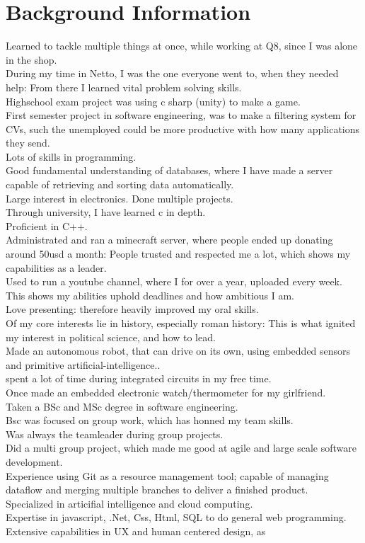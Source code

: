 \section*{Background Information}
Learned to tackle multiple things at once, while working at Q8, since I was alone in the shop.\\During my time in Netto, I was the one everyone went to, when they needed help: From there I learned vital problem solving skills.\\Highschool exam project was using c sharp (unity) to make a game.\\First semester project in software engineering, was to make a filtering system for CVs, such the unemployed could be more productive with how many applications they send.\\Lots of skills in programming.\\Good fundamental understanding of databases, where I have made a server capable of retrieving and sorting data automatically.\\Large interest in electronics. Done multiple projects.\\Through university, I have learned c in depth.\\Proficient in C++.\\Administrated and ran a minecraft server, where people ended up donating around 50usd a month: People trusted and respected me a lot, which shows my capabilities as a leader.\\Used to run a youtube channel, where I for over a year, uploaded every week. This shows my abilities uphold deadlines and how ambitious I am.\\Love presenting: therefore heavily improved my oral skills.\\Of my core interests lie in history, especially roman history: This is what ignited my interest in political science, and how to lead.\\Made an autonomous robot, that can drive on its own, using embedded sensors and primitive artificial-intelligence..\\spent a lot of time during integrated circuits in my free time.\\Once made an embedded electronic watch/thermometer for my girlfriend.\\Taken a BSc and MSc degree in software engineering.\\Bsc was focused on group work, which has honned my team skills.\\Was always the teamleader during group projects.\\Did a multi group project, which made me good at agile and large scale software development.\\Experience using Git as a resource management tool; capable of managing dataflow and merging multiple branches to deliver a finished product.\\Specialized in articifial intelligence and cloud computing.\\Expertise in javascript, .Net, Css, Html, SQL to do general web programming.\\Extensive capabilities in UX and human centered design, as 